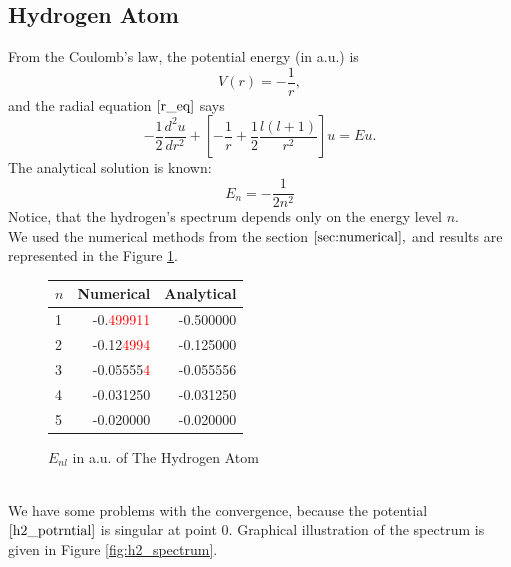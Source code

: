 \documentclass[a4paper, 12pt]{article}
\begin{document}
\subsection{Hydrogen Atom}
From the Coulomb's law, the potential energy (in a.u.) is 
\begin{equation}\label{h2_potrntial}
	V(r) = -\frac{1}{r},
\end{equation}
and the radial equation $\eqref{r_eq}$  says
$$-\frac{1}{2}\frac{d^2 u}{dr^2}+[-\frac{1}{r}+\frac{1}{2}\frac{l(l+1)}{r^2}]u = Eu.$$
The analytical solution is known:
\begin{equation}\label{h2_sol}
   E_n = -\frac{1}{2 n^2}
\end{equation}
Notice, that the hydrogen's spectrum depends only on the energy level $n$.\\
We used the numerical methods from the section $\ref{sec:numerical},$ and results are represented in the Figure \ref{fig:h2_bar}.
\begin{figure}[h!]
\centering
\begin{tabular}{lrr}
\toprule
\centering
$n$ &         Numerical &         Analytical \\
\midrule
1 & -0.\textcolor{red}{499911} & -0.500000 \\
2 & -0.12\textcolor{red}{4994} & -0.125000 \\
3 & -0.05555\textcolor{red}{4} & -0.055556 \\
4 & -0.031250 & -0.031250 \\
5 & -0.020000 & -0.020000 \\
\bottomrule
\end{tabular}
\caption{$E_{nl}$ in a.u. of The Hydrogen Atom}
\label{fig:h2_bar}
\end{figure}\\
We have some problems with the convergence, because the potential $\eqref{h2_potrntial}$ is singular at point 0. Graphical illustration of the spectrum is given in Figure \ref{fig:h2_spectrum}.
\end{document}
